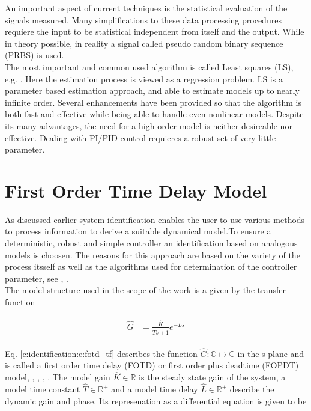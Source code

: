 An important aspect of current techniques is the statistical evaluation of the signals measured. Many simplifications to these data processing procedures requiere the input to be statistical independent from itself and the output. While in theory possible, in reality a signal called pseudo random binary sequence (PRBS) is used.\\

The most important and common used algorithm is called Least squares (LS), e.g. \cite[p.62 ff.]{Keesman2011}. Here the estimation process is viewed as a regression problem. LS is a parameter based estimation approach, and able to estimate models up to nearly infinite order. Several enhancements have been provided so that the algorithm is both fast and effective while being able to handle even nonlinear models. Despite its many advantages, the need for a high order model is neither desireable nor effective. Dealing with PI/PID control requieres a robust set of very little parameter.\\

\section{First Order Time Delay Model}%
\label{c:identification:s:fotd}

As discussed earlier system identification enables the user to use various methods to process information to derive a suitable dynamical model.To ensure a deterministic, robust and simple controller an identification based on analogous models is choosen. The reasons for this approach are based on the variety of the process itsself as well as the algorithms used for determination of the controller parameter, see \cite{Astrom1995}, \cite{Astrom2006}.\\

The model structure used in the scope of the work is a given by the transfer function

\begin{align}
\begin{split}
\hat{G} &= \frac{\hat{K}}{\hat{T}s+1}e^{-\hat{L}s}
\end{split}
\label{c:identification:e:fotd_tf}
\end{align}

Eq. \ref{c:identification:e:fotd_tf} describes the function $\hat{G}: \mathbb{C} \mapsto \mathbb{C}$ in the s-plane and is called a first order time delay (FOTD) or first order plus deadtime (FOPDT) model, \cite[p.16]{Astrom1995}, \cite[p.20, p.26]{Astrom2006}, \cite{Fedele2009a}, \cite{Bi1999}.
The model gain $\hat{K} \in \mathbb{R}$ is the steady state gain of the system, a model time constant $\hat{T} \in \mathbb{R}^+$ and a model time delay $\hat{L} \in \mathbb{R}^+$ describe the dynamic gain and phase. Its represenation as a differential equation is given to be

